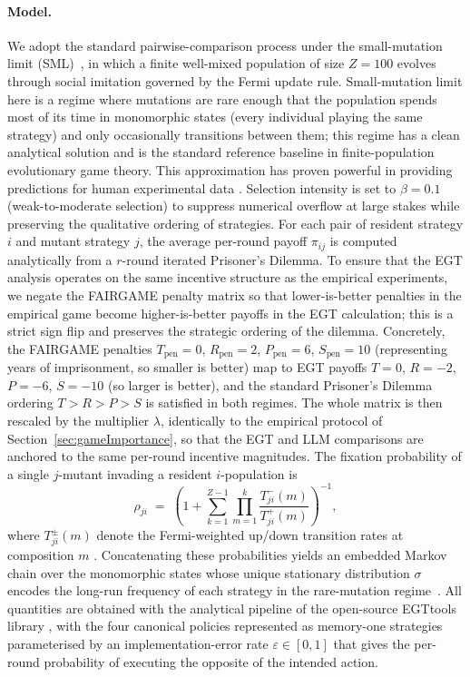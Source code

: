 \documentclass[a4paper,fleqn]{cas-sc}
\begin{document}
\paragraph{Model.} We adopt the standard pairwise-comparison process under the small-mutation limit (SML)~\cite{sigmund:2010bo,han_when_2021,nowak2004emergence,liu2020evolutionary}, in which a finite well-mixed population of size $Z = 100$ evolves through social imitation governed by the Fermi update rule. Small-mutation limit  here is a regime where mutations are rare enough that the population spends most of its time in monomorphic states (every individual playing the same strategy) and only occasionally transitions between them; this regime has a clean analytical solution and is the standard reference baseline in finite-population evolutionary game theory. This approximation has proven powerful in providing  predictions for human experimental data \cite{rand2013evolution,zisis2015generosity}. Selection intensity is set to $\beta = 0.1$ (weak-to-moderate selection) to suppress numerical overflow at large stakes while preserving the qualitative ordering of strategies. For each pair of resident strategy $i$ and mutant strategy $j$, the average per-round payoff $\pi_{ij}$ is computed analytically from a $r$-round iterated Prisoner's Dilemma. To ensure that the EGT analysis operates on the same incentive structure as the empirical experiments, we negate the FAIRGAME penalty matrix so that lower-is-better penalties in the empirical game become higher-is-better payoffs in the EGT calculation; this is a strict sign flip and preserves the strategic ordering of the dilemma. Concretely, the FAIRGAME penalties $T_{\text{pen}}{=}0$, $R_{\text{pen}}{=}2$, $P_{\text{pen}}{=}6$, $S_{\text{pen}}{=}10$ (representing years of imprisonment, so smaller is better) map to EGT payoffs $T{=}0$, $R{=}{-}2$, $P{=}{-}6$, $S{=}{-}10$ (so larger is better), and the standard Prisoner's Dilemma ordering $T > R > P > S$ is satisfied in both regimes. The whole matrix is then rescaled by the multiplier $\lambda$, identically to the empirical protocol of Section~\ref{sec:gameImportance}, so that the EGT and LLM comparisons are anchored to the same per-round incentive magnitudes. The fixation probability of a single $j$-mutant invading a resident $i$-population is
\begin{equation}
\rho_{ji} \;=\; \left(1 + \sum_{k=1}^{Z-1}\prod_{m=1}^{k}\frac{T^{-}_{ji}(m)}{T^{+}_{ji}(m)}\right)^{-1},
\end{equation}
where $T^{\pm}_{ji}(m)$ denote the Fermi-weighted up/down transition rates at composition $m$ \cite{szabo1998evolutionary}. Concatenating these probabilities yields an embedded Markov chain over the monomorphic states whose unique stationary distribution $\sigma$ encodes the long-run frequency of each strategy in the rare-mutation regime~\cite{sigmund:2010bo}. All quantities are obtained with the analytical pipeline of the open-source EGTtools library \cite{domingos2023egttools}, with the four canonical policies represented as memory-one strategies parameterised by an implementation-error rate $\varepsilon \in [0,1]$ that gives the per-round probability of executing the opposite of the intended action.
\end{document}
